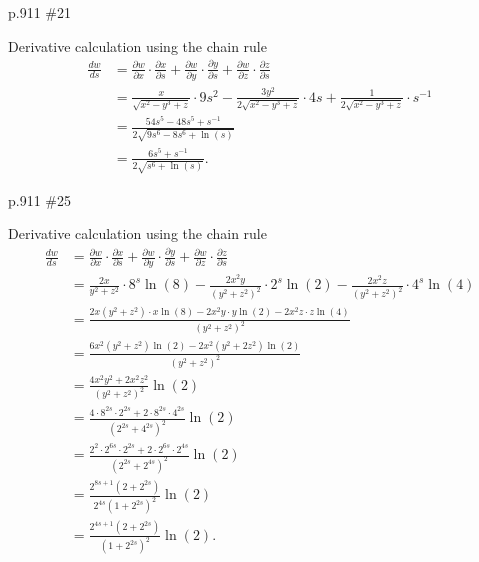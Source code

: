 \begin{practice}p.911 \#21\end{practice}
\begin{pracsol}
  Derivative calculation using the chain rule
  \[\begin{split}
    \frac{dw}{ds} &= \frac{\partial w}{\partial x}\cdot\frac{\partial x}{\partial s}+\frac{\partial w}{\partial y}\cdot\frac{\partial y}{\partial s}+\frac{\partial w}{\partial z}\cdot\frac{\partial z}{\partial s}\\
    &=\frac{x}{\sqrt{x^2-y^3+z}}\cdot 9s^2-\frac{3y^2}{2\sqrt{x^2-y^3+z}}\cdot 4s+\frac1{2\sqrt{x^2-y^3+z}}\cdot s^{-1}\\
    &=\frac{54s^5-48s^5+s^{-1}}{2\sqrt{9s^6-8s^6+\ln(s)}}\\
    &= \frac{6s^5+s^{-1}}{2\sqrt{s^6+\ln(s)}}.
  \end{split}\]
\end{pracsol}

\begin{practice}p.911 \#25\end{practice}
\begin{pracsol}
  Derivative calculation using the chain rule
  \[\begin{split}
    \frac{dw}{ds}&=\frac{\partial w}{\partial x}\cdot\frac{\partial x}{\partial s}+\frac{\partial w}{\partial y}\cdot\frac{\partial y}{\partial s}+\frac{\partial w}{\partial z}\cdot\frac{\partial z}{\partial s}\\
    &= \frac{2x}{y^2+z^2}\cdot 8^s\ln(8)-\frac{2x^2y}{(y^2+z^2)^2}\cdot 2^s\ln(2)-\frac{2x^2z}{(y^2+z^2)^2}\cdot 4^s\ln(4)\\
    &= \frac{2x(y^2+z^2)\cdot x\ln(8)-2x^2y\cdot y\ln(2)-2x^2z\cdot z\ln(4)}{(y^2+z^2)^2}\\
    &= \frac{6x^2(y^2+z^2)\ln(2)-2x^2(y^2+2z^2)\ln(2)}{(y^2+z^2)^2}\\
    &= \frac{4x^2y^2+2x^2z^2}{(y^2+z^2)^2}\ln(2)\\
    &=\frac{4\cdot 8^{2s}\cdot 2^{2s}+2\cdot 8^{2s}\cdot 4^{2s}}{(2^{2s}+4^{2s})^2}\ln(2)\\
    &= \frac{2^2\cdot 2^{6s}\cdot 2^{2s}+2\cdot 2^{6s}\cdot 2^{4s}}{(2^{2s}+2^{4s})^2}\ln(2)\\
    &= \frac{2^{8s+1}(2+2^{2s})}{2^{4s}(1+2^{2s})^2}\ln(2)\\
    &= \frac{2^{4s+1}(2+2^{2s})}{(1+2^{2s})^2}\ln(2).
  \end{split}\]
\end{pracsol}


